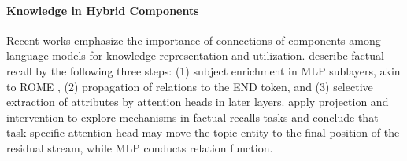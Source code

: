 
\paragraph{Knowledge in Hybrid Components}
Recent works emphasize the importance of connections of components among language models for knowledge representation and utilization.
\citet{geva-etal-2023-dissecting} describe factual recall by the following three steps:
(1) subject enrichment in MLP sublayers, akin to ROME \cite{meng2022locating}, (2) propagation of relations to the END token, and (3) selective extraction of attributes by attention heads in later layers.
\citet{lv2024interpreting} apply projection and intervention to explore mechanisms in factual recalls tasks and conclude that task-specific attention head may move the topic entity to the final position of the residual stream, while MLP conducts relation function.

